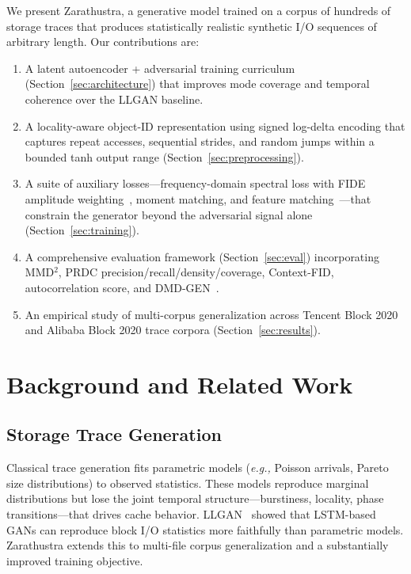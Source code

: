 \documentclass[10pt,twocolumn]{article}
\newcommand{\sys}{Zarathustra\xspace}
\newcommand{\eg}{\emph{e.g.,}\xspace}
\newcommand{\mmd}{MMD$^2$\xspace}
\begin{document}
We present \sys, a generative model trained on a corpus of hundreds
of storage traces that produces statistically realistic synthetic I/O
sequences of arbitrary length.  Our contributions are:

\begin{enumerate}
  \item A latent autoencoder + adversarial training curriculum
        (Section~\ref{sec:architecture}) that improves mode coverage
        and temporal coherence over the LLGAN baseline.

  \item A locality-aware object-ID representation using signed
        log-delta encoding that captures repeat accesses, sequential
        strides, and random jumps within a bounded tanh output range
        (Section~\ref{sec:preprocessing}).

  \item A suite of auxiliary losses---frequency-domain spectral loss
        with FIDE amplitude weighting~\cite{fide2024}, moment matching,
        and feature matching~\cite{r3gan2024}---that constrain the
        generator beyond the adversarial signal alone
        (Section~\ref{sec:training}).

  \item A comprehensive evaluation framework
        (Section~\ref{sec:eval}) incorporating \mmd, PRDC
        precision/recall/density/coverage, Context-FID, autocorrelation
        score, and DMD-GEN~\cite{dmdgen2025}.

  \item An empirical study of multi-corpus generalization across
        Tencent Block 2020 and Alibaba Block 2020 trace corpora
        (Section~\ref{sec:results}).
\end{enumerate}


\section{Background and Related Work}
\label{sec:background}

\subsection{Storage Trace Generation}

Classical trace generation fits parametric models (\eg Poisson
arrivals, Pareto size distributions) to observed statistics.  These
models reproduce marginal distributions but lose the joint temporal
structure---burstiness, locality, phase transitions---that drives
cache behavior.  LLGAN~\cite{zhang2024llgan} showed that LSTM-based
GANs can reproduce block I/O statistics more faithfully than
parametric models.  \sys extends this to multi-file corpus
generalization and a substantially improved training objective.
\end{document}
